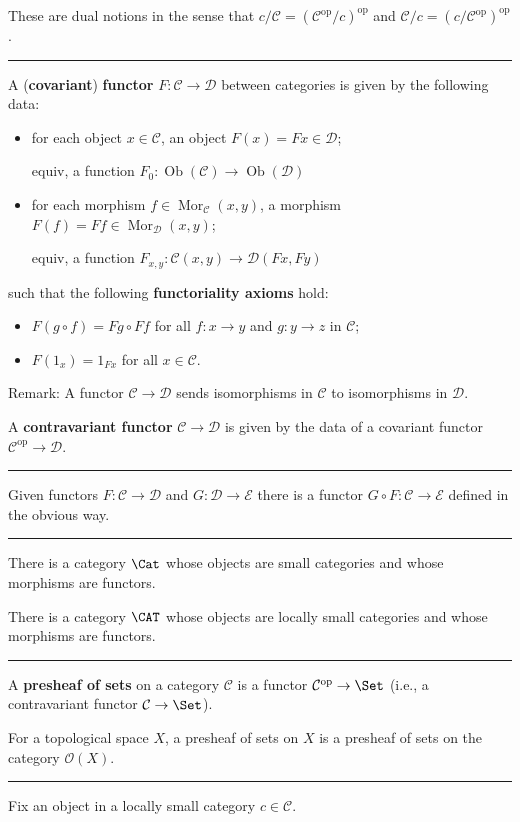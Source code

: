 \documentclass[12pt]{article}
\newcommand{\keyword}[1]{\textbf{#1}}
\newcommand{\sepline}{\rule{\textwidth}{0.4pt}}
\theoremstyle{definition}
\newcommand{\CC}{\mathcal{C}}
\newcommand{\DD}{\mathcal{D}}
\newcommand{\EE}{\mathcal{E}}
\newcommand{\OO}{\mathcal{O}}
\newcommand{\<}{\left\langle}
\renewcommand{\>}{\right\rangle}
\DeclareMathOperator{\Ob}{Ob}
\DeclareMathOperator{\Mor}{Mor}
\newcommand{\op}{\mathrm{op}}
\renewcommand{\_}[1]{{_{#1}}}
\begin{document}
These are dual notions in the sense that $c/\CC = (\CC^\op/c)^\op$ and $\CC/c = (c/\CC^\op)^\op$.

\sepline

A (\keyword{covariant}) \keyword{functor} $F : \CC \to \DD$ between categories is given by the following data:
\begin{itemize}
    \item for each object $x \in \CC$, an object $F(x) = Fx \in \DD$;

    equiv, a function $F_0 : \Ob(\CC) \to \Ob(\DD)$
    \item for each morphism $f \in \Mor_\CC(x, y)$, a morphism $F(f) = Ff \in \Mor_\DD(x, y)$;

    equiv, a function $F_{x,y} : \CC(x, y) \to \DD(Fx, Fy)$
\end{itemize}
such that the following \keyword{functoriality axioms} hold:
\begin{itemize}
    \item $F(g \circ f) = Fg \circ Ff$ for all $f : x \to y$ and $g : y \to z$ in $\CC$;
    \item $F(1_x) = 1_{Fx}$ for all $x \in \CC$.
\end{itemize}

Remark: A functor $\CC \to \DD$ sends isomorphisms in $\CC$ to isomorphisms in $\DD$.

A \keyword{contravariant functor} $\CC \to \DD$ is given by the data of a covariant functor $\CC^\op \to \DD$.

\sepline

Given functors $F : \CC \to \DD$ and $G : \DD \to \EE$ there is a functor $G \circ F : \CC \to \EE$ defined in the obvious way.


\sepline

There is a category $\Cat$ whose objects are small categories and whose morphisms are functors.

There is a category $\CAT$ whose objects are locally small categories and whose morphisms are functors.


\sepline

A \keyword{presheaf of sets} on a category $\CC$ is a functor $\CC^\op \to \Set$ (i.e., a contravariant functor $\CC \to \Set$).

For a topological space $X$, a presheaf of sets on $X$ is a presheaf of sets on the category $\OO(X)$.

\sepline

Fix an object in a locally small category $c \in \CC$.
\end{document}
